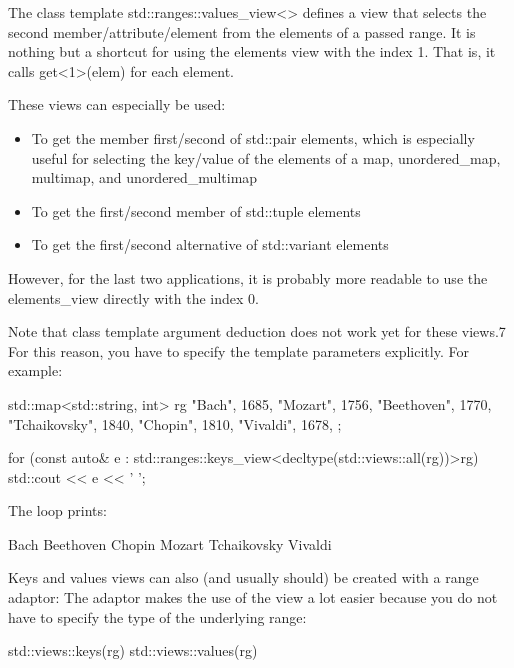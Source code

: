 The class template std::ranges::values\_view<> defines a view that selects the second member/attribute/element from the elements of a passed range. It is nothing but a shortcut for using the elements view with the index 1. That is, it calls get<1>(elem) for each element.

These views can especially be used:

\begin{itemize}
\item
To get the member first/second of std::pair elements, which is especially useful for selecting the key/value of the elements of a map, unordered\_map, multimap, and unordered\_multimap

\item
To get the first/second member of std::tuple elements

\item
To get the first/second alternative of std::variant elements
\end{itemize}

However, for the last two applications, it is probably more readable to use the elements\_view directly with the index 0.

Note that class template argument deduction does not work yet for these views.7 For this reason, you have to specify the template parameters explicitly. For example:

\begin{cpp}
std::map<std::string, int> rg{
	{"Bach", 1685}, {"Mozart", 1756}, {"Beethoven", 1770},
	{"Tchaikovsky", 1840}, {"Chopin", 1810}, {"Vivaldi", 1678},
};

for (const auto& e : std::ranges::keys_view<decltype(std::views::all(rg))>{rg}) {
	std::cout << e << ' ';
}
\end{cpp}

The loop prints:

\begin{shell}
Bach Beethoven Chopin Mozart Tchaikovsky Vivaldi
\end{shell}


Keys and values views can also (and usually should) be created with a range adaptor: The adaptor makes the use of the view a lot easier because you do not have to specify the type of the underlying range:

\begin{cpp}
std::views::keys(rg)
std::views::values(rg)
\end{cpp}

